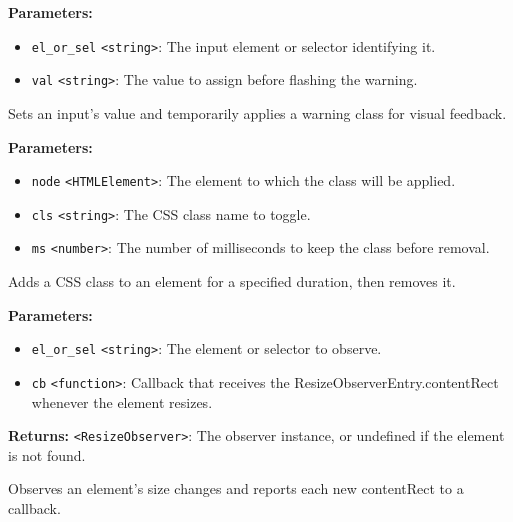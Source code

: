 \documentclass[12pt,a4paper]{article}
\begin{document}
\noindent \textbf{Parameters:}
\begin{itemize}
  \item \texttt{el\_or\_sel} \texttt{<string>}: The input element or selector identifying it.
  \item \texttt{val} \texttt{<string>}: The value to assign before flashing the warning.
\end{itemize}

\noindent Sets an input’s value and temporarily applies a \textasciigrave{}warning\textasciigrave{} class for visual feedback.

\vspace{5mm}
\noindent {}


\noindent \textbf{Parameters:}
\begin{itemize}
  \item \texttt{node} \texttt{<HTMLElement>}: The element to which the class will be applied.
  \item \texttt{cls} \texttt{<string>}: The CSS class name to toggle.
  \item \texttt{ms} \texttt{<number>}: The number of milliseconds to keep the class before removal.
\end{itemize}

\noindent Adds a CSS class to an element for a specified duration, then removes it.

\vspace{5mm}
\noindent {}


\noindent \textbf{Parameters:}
\begin{itemize}
  \item \texttt{el\_or\_sel} \texttt{<string>}: The element or selector to observe.
  \item \texttt{cb} \texttt{<function>}: Callback that receives the \textasciigrave{}ResizeObserverEntry.contentRect\textasciigrave{} whenever the element resizes.
\end{itemize}

\noindent \textbf{Returns:} \texttt{<ResizeObserver>}: The observer instance, or \textasciigrave{}undefined\textasciigrave{} if the element is not found.

\noindent Observes an element’s size changes and reports each new \textasciigrave{}contentRect\textasciigrave{} to a callback.
\end{document}
